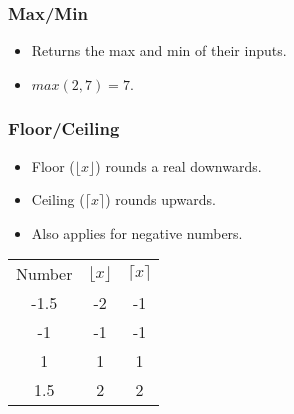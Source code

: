 \subsubsection{Max/Min}
\begin{itemize}
    \item Returns the max and min of their inputs.
    \item $max(2,7) = 7$.
\end{itemize}

\subsubsection{Floor/Ceiling}
\begin{itemize}
    \item Floor ($\lfloor x\rfloor$) rounds a real downwards.
    \item Ceiling ($\lceil x\rceil$) rounds upwards.
    \item Also applies for negative numbers.
\end{itemize}

\begin{tabular}{ccc}
    Number & $\lfloor x\rfloor$ & $\lceil x\rceil$ \\
    -1.5 & -2 & -1 \\
    -1 & -1 & -1 \\
    1 & 1 & 1 \\
    1.5 & 2 & 2 \\
\end{tabular}

